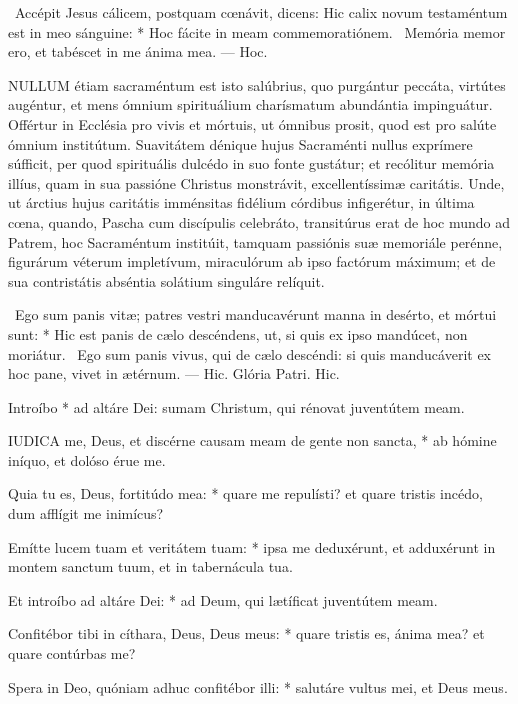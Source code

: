 \R\ Accépit Jesus cálicem, postquam cœnávit, dicens: Hic calix novum testaméntum est in meo sánguine: * Hoc fácite in meam commemoratiónem. \V\ Memória memor ero, et tabéscet in me ánima mea. --- Hoc.


\lettrine[lines=2]{N}{ULLUM} étiam sacraméntum est isto salúbrius, quo purgántur peccáta, virtútes augéntur, et mens ómnium spirituálium charísmatum abundántia impinguátur. Offértur in Ecclésia pro vivis et mórtuis, ut ómnibus prosit, quod est pro salúte ómnium institútum. Suavitátem dénique hujus Sacraménti nullus exprímere súfficit, per quod spirituális dulcédo in suo fonte gustátur; et recólitur memória illíus, quam in sua passióne Christus monstrávit, excellentíssimæ caritátis. Unde, ut árctius hujus caritátis imménsitas fidélium córdibus infigerétur, in última cœna, quando, Pascha cum discípulis celebráto, transitúrus erat de hoc mundo ad Patrem, hoc Sacraméntum institúit, tamquam passiónis suæ memoriále perénne, figurárum véterum impletívum, miraculórum ab ipso factórum máximum; et de sua contristátis abséntia solátium singuláre relíquit.

\R\ Ego sum panis vitæ; patres vestri manducavérunt manna in desérto, et mórtui sunt: * Hic est panis de cælo descéndens, ut, si quis ex ipso mandúcet, non moriátur. \V\ Ego sum panis vivus, qui de cælo descéndi: si quis manducáverit ex hoc pane, vivet in ætérnum. --- Hic. Glória Patri. Hic.


 Introíbo * ad altáre Dei: sumam Christum, qui rénovat juventútem meam.


\lettrine[lines=2]{I}{UDICA} me, Deus, et discérne causam meam de gente non sancta, * ab hómine iníquo, et dolóso érue me.

Quia tu es, Deus, fortitúdo mea: * quare me repulísti? et quare tristis incédo, dum afflígit me inimícus?

Emítte lucem tuam et veritátem tuam: * ipsa me deduxérunt, et adduxérunt in montem sanctum tuum, et in tabernácula tua.

Et introíbo ad altáre Dei: * ad Deum, qui lætíficat juventútem meam.

Confitébor tibi in cíthara, Deus, Deus meus: * quare tristis es, ánima mea? et quare contúrbas me?

Spera in Deo, quóniam adhuc confitébor illi: * salutáre vultus mei, et Deus meus.

